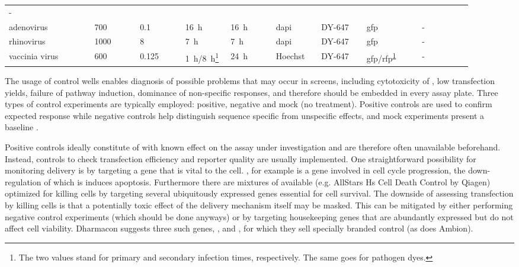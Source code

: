 \begin{table}
\begin{minipage}{\textwidth}
\begin{tabular}{L{0.17\linewidth}C{0.09\linewidth}C{0.09\linewidth}C{0.09\linewidth}C{0.09\linewidth}C{0.09\linewidth}C{0.09\linewidth}C{0.11\linewidth}C{0.10\linewidth}}
      - \\
    adenovirus &
      700 &
      0.1 &
      \SI{16}{\hour} &
      \SI{16}{\hour} &
      \acrshort{dapi} &
      DY-647 &
      \acrshort{gfp} &
      - \\
    rhinovirus &
      1000 &
      8 &
      \SI{7}{\hour} &
      \SI{7}{\hour} &
      \acrshort{dapi} &
      DY-647 &
      \acrshort{gfp} &
      - \\
    vaccinia virus &
      600 &
      0.125 &
      \SI{1}{\hour}\slash \SI{8}{\hour}\footnote{\label{fn:prim-sec} The two values stand for primary and secondary infection times, respectively. The same goes for pathogen dyes.} &
      \SI{24}{\hour} &
      Hoechst &
      DY-647 &
      \acrshort{gfp}\slash \acrshort{rfp}\textsuperscript{\ref{fn:prim-sec}} &
      - \\
  \end{tabular}
  \end{minipage}
\end{table}

The usage of control wells enables diagnosis of possible problems that may occur in  screens, including cytotoxicity of , low transfection yields, failure of  pathway induction, dominance of non-specific responses, and therefore should be embedded in every assay plate. Three types of control experiments are typically employed: positive, negative and mock (no  treatment). Positive controls are used to confirm expected response while negative controls help distinguish sequence specific from unspecific effects, and mock experiments present a baseline \citep{Sittampalam2004}.

Positive controls ideally constitute of  with known effect on the assay under investigation and are therefore often unavailable beforehand. Instead, controls to check transfection efficiency and reporter quality are usually implemented. One straightforward possibility for monitoring delivery is by targeting a gene that is vital to the cell. , for example is a gene involved in cell cycle progression, the down-regulation of which is induces apoptosis. Furthermore there are mixtures of  available (e.g. AllStars Hs Cell Death Control  by Qiagen) optimized for killing cells by targeting several ubiquitously expressed genes essential for cell survival. The downside of assessing transfection by killing cells is that a potentially toxic effect of the delivery mechanism itself may be masked. This can be mitigated by either performing negative control experiments (which should be done anyways) or by targeting housekeeping genes that are abundantly expressed but do not affect cell viability. Dharmacon suggests three such genes, ,  and , for which they sell specially branded control  (as does Ambion).

